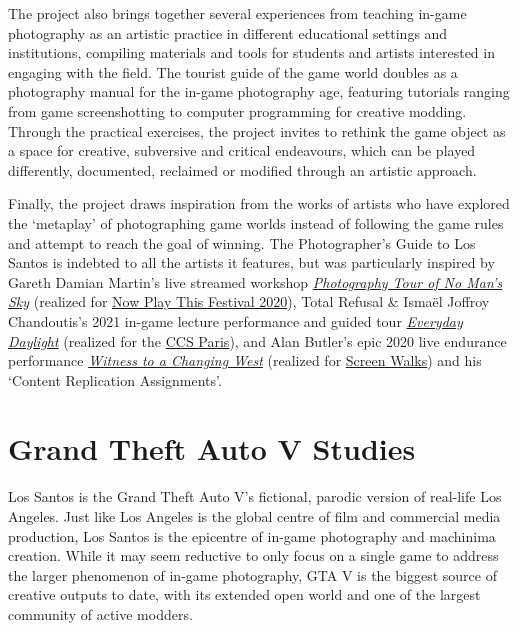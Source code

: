 \documentclass[
  openany]{book}
\begin{document}
The project also brings together several experiences from teaching in-game photography as an artistic practice in different educational settings and institutions, compiling materials and tools for students and artists interested in engaging with the field. The tourist guide of the game world doubles as a photography manual for the in-game photography age, featuring tutorials ranging from game screenshotting to computer programming for creative modding. Through the practical exercises, the project invites to rethink the game object as a space for creative, subversive and critical endeavours, which can be played differently, documented, reclaimed or modified through an artistic approach.

Finally, the project draws inspiration from the works of artists who have explored the `metaplay' of photographing game worlds instead of following the game rules and attempt to reach the goal of winning. The Photographer's Guide to Los Santos is indebted to all the artists it features, but was particularly inspired by Gareth Damian Martin's live streamed workshop \href{https://www.twitch.tv/videos/591840067}{\emph{Photography Tour of No Man's Sky}} (realized for \href{https://www.somersethouse.org.uk/whats-on/now-play-this-2020}{Now Play This Festival 2020}), Total Refusal \& Ismaël Joffroy Chandoutis's 2021 in-game lecture performance and guided tour \href{https://vimeo.com/506064357}{\emph{Everyday Daylight}} (realized for the \href{https://ccsparis.com/en/events/total-refusal-digital-disarmament-movement-a-la-gaite-lyrique/}{CCS Paris}), and Alan Butler's epic 2020 live endurance performance \href{https://www.youtube.com/watch?v=R4Q2G6tOQ_Q}{\emph{Witness to a Changing West}} (realized for \href{https://screenwalks.com/}{Screen Walks}) and his `Content Replication Assignments'.

\hypertarget{grand-theft-auto-v-studies}{%
\section*{Grand Theft Auto V Studies}\label{grand-theft-auto-v-studies}}

Los Santos is the Grand Theft Auto V's fictional, parodic version of real-life Los Angeles. Just like Los Angeles is the global centre of film and commercial media production, Los Santos is the epicentre of in-game photography and machinima creation. While it may seem reductive to only focus on a single game to address the larger phenomenon of in-game photography, GTA V is the biggest source of creative outputs to date, with its extended open world and one of the largest community of active modders.
\end{document}

